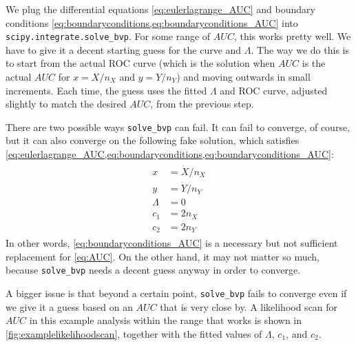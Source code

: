 \documentclass[11pt]{article}
\newcommand{\Xdot}{\dot{X}}
\newcommand{\Ydot}{\dot{Y}}
\newcommand{\AUC}{AUC}
\begin{document}
We plug the differential equations \cref{eq:eulerlagrange_AUC} and boundary conditions \cref{eq:boundaryconditions,eq:boundaryconditions_AUC} into \texttt{scipy.integrate.solve\_bvp}.  For some range of \(\AUC\), this works pretty well.  We have to give it a decent starting guess for the curve and \(\Lambda\).  The way we do this is to start from the actual ROC curve (which is the solution when \(\AUC\) is the actual \(\AUC\) for \(x=X/n_X\) and \(y=Y/n_Y\)) and moving outwards in small increments.  Each time, the guess uses the fitted \(\Lambda\) and ROC curve, adjusted slightly to match the desired \(\AUC\), from the previous step.

There are two possible ways \texttt{solve\_bvp} can fail.  It can fail to converge, of course, but it can also converge on the following fake solution, which satisfies \cref{eq:eulerlagrange_AUC,eq:boundaryconditions,eq:boundaryconditions_AUC}:
\begin{align}
\begin{aligned}
x&=\Xdot/n_X \\
y&=\Ydot/n_Y \\
\Lambda&=0 \\
c_1&=2n_X \\
c_2&=2n_Y
\end{aligned}
\end{align}
In other words, \cref{eq:boundaryconditions_AUC} is a necessary but not sufficient replacement for \cref{eq:AUC}.  On the other hand, it may not matter so much, because \texttt{solve\_bvp} needs a decent guess anyway in order to converge.

A bigger issue is that beyond a certain point, \texttt{solve\_bvp} fails to converge even if we give it a guess based on an \(\AUC\) that is very close by.  A likelihood scan for \(\AUC\) in this example analysis within the range that works is shown in \cref{fig:examplelikelihoodscan}, together with the fitted values of \(\Lambda\), \(c_1\), and \(c_2\).
\end{document}
